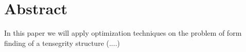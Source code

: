 \section{Abstract}
In this paper we will apply optimization techniques on the problem of form finding of a tensegrity structure (....)